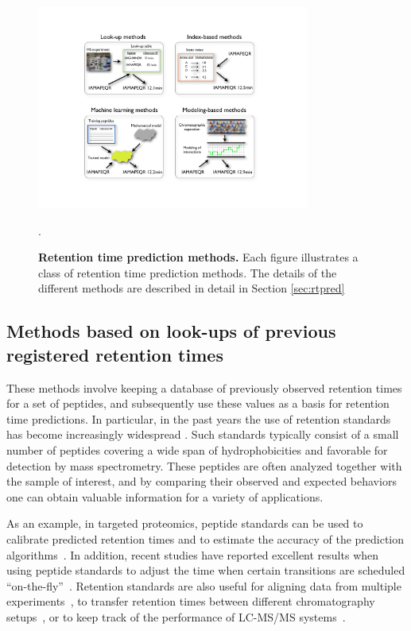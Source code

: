 \documentclass[a4paper]{article}
\begin{document}
\begin{figure}[p]
\centering \includegraphics[clip=true,
  width=0.8\textwidth]{img/methods.pdf}
\caption{\label{fig:methods} {\bf Retention time prediction methods.}
  Each figure illustrates a class of retention time prediction
  methods. The details of the different methods are described in
  detail in Section \ref{sec:rtpred}}.
\vspace{-7pt}
\end{figure}

\subsection{Methods based on look-ups of previous registered retention times}

These methods involve keeping a database of previously observed
retention times for a set of peptides, and subsequently use these
values as a basis for retention time predictions. In particular, in
the past years the use of retention standards has become increasingly
widespread \cite{olegstd, irt}. Such standards typically consist of a
small number of peptides covering a wide span of hydrophobicities and
favorable for detection by mass spectrometry. These peptides are often
analyzed together with the sample of interest, and by comparing their
observed and expected behaviors one can obtain valuable information
for a variety of applications.

\vspace{0.15cm}

As an example, in targeted proteomics, peptide standards can be used to
 calibrate predicted retention times and to estimate the accuracy of
 the prediction algorithms~\cite{Kiyonami01022011}. In addition,
 recent studies have reported excellent results when using peptide
 standards to adjust the time when certain transitions are scheduled
 ``on-the-fly''~\cite{seb, irt}. Retention standards are also useful
 for aligning data from multiple experiments~\cite{petritis2003}, to
 transfer retention times between different chromatography
 setups~\cite{seb}, or to keep track of the performance of LC-MS/MS
 systems~\cite{qcal}.
\end{document}
